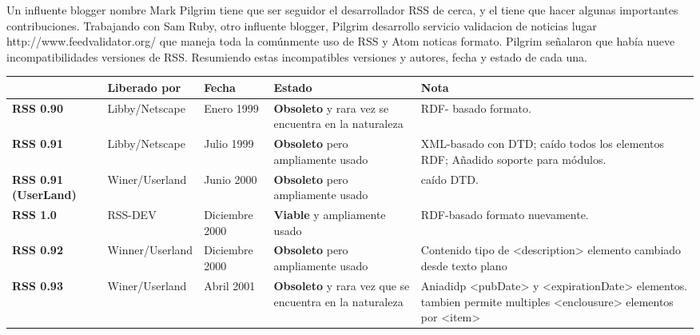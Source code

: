 Un influente blogger nombre Mark Pilgrim tiene que ser seguidor el desarrollador RSS de cerca, y el tiene que hacer
algunas importantes contribuciones. Trabajando con Sam Ruby, otro influente blogger, Pilgrim desarrollo servicio validacion de noticias lugar http://www.feedvalidator.org/ que maneja toda la comúnmente uso de RSS y Atom noticas
formato. 
Pilgrim señalaron que había nueve incompatibilidades versiones de RSS. Resumiendo estas incompatibles versiones y
autores, fecha y estado de cada una.\cite{johnson2006rss}

\begin{minipage}[b]{\hsize}\centering

\begin{tabular}{>{\centering\arraybackslash}m{.05\linewidth} |>{\centering\arraybackslash}m{.17\linewidth}|>{\centering\arraybackslash}m{.1\linewidth}|>{\centering\arraybackslash}m{.2\linewidth}|>{\centering\arraybackslash}m{.4\linewidth}}

& \textbf{Liberado por} & \textbf{Fecha} & \textbf{Estado} & \textbf{Nota} \\
\hline

\textbf{RSS 0.90} & Libby/Netscape & Enero 1999 & \textbf{Obsoleto} y rara vez se encuentra en la naturaleza & RDF- basado formato. \\
\hline

\textbf{RSS 0.91 } & Libby/Netscape & Julio 1999 & \textbf{Obsoleto} pero ampliamente usado & XML-basado con DTD; caído todos los elementos RDF; Añadido soporte para módulos. \\
\hline 

\textbf{RSS 0.91 (UserLand) } & Winer/Userland & Junio 2000 & \textbf{Obsoleto} pero ampliamente usado & caído DTD. \\
\hline 

\textbf{RSS 1.0} & RSS-DEV & Diciembre 2000 & \textbf{Viable} y ampliamente usado & RDF-basado formato nuevamente.\\
\hline

\textbf{RSS 0.92} & Winner/Userland & Diciembre 2000 & \textbf{Obsoleto} pero ampliamente usado & Contenido tipo de <description> elemento cambiado desde texto plano\\
\hline

\textbf{RSS 0.93} & Winer/Userland & Abril 2001 & \textbf{Obsoleto} y rara vez que se encuentra en la naturaleza & Aniadidp <pubDate> y <expirationDate> elementos. tambien permite multiples <enclousure> elementos por <item> \\
\hline


\end{tabular}
\end{minipage}
